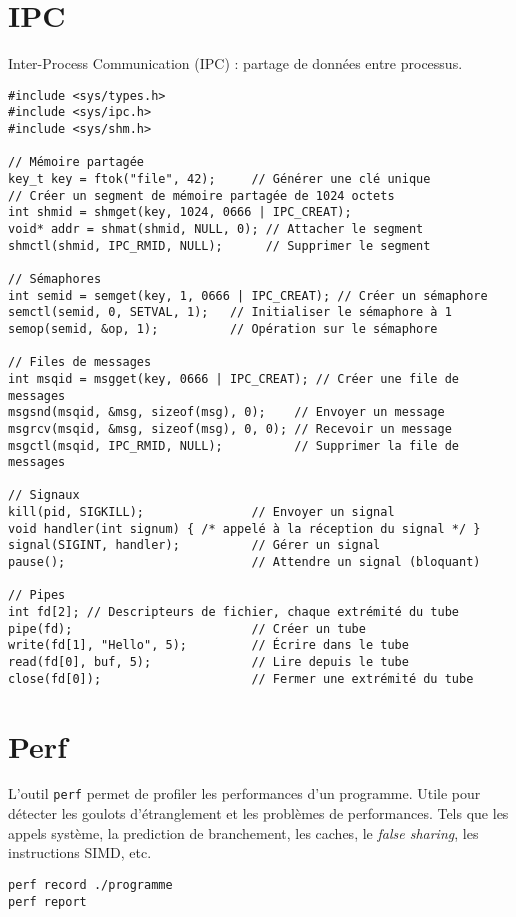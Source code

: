 \documentclass{article}
\newcommand{\cd}{\lstinline}
\begin{document}
\begin{multicols*}{3}
\section*{IPC}
Inter-Process Communication (IPC) : partage de données entre processus.
\begin{lstlisting}
#include <sys/types.h>
#include <sys/ipc.h>
#include <sys/shm.h>

// Mémoire partagée
key_t key = ftok("file", 42);     // Générer une clé unique
// Créer un segment de mémoire partagée de 1024 octets
int shmid = shmget(key, 1024, 0666 | IPC_CREAT);
void* addr = shmat(shmid, NULL, 0); // Attacher le segment
shmctl(shmid, IPC_RMID, NULL);      // Supprimer le segment

// Sémaphores
int semid = semget(key, 1, 0666 | IPC_CREAT); // Créer un sémaphore
semctl(semid, 0, SETVAL, 1);   // Initialiser le sémaphore à 1
semop(semid, &op, 1);          // Opération sur le sémaphore

// Files de messages
int msqid = msgget(key, 0666 | IPC_CREAT); // Créer une file de messages
msgsnd(msqid, &msg, sizeof(msg), 0);    // Envoyer un message
msgrcv(msqid, &msg, sizeof(msg), 0, 0); // Recevoir un message
msgctl(msqid, IPC_RMID, NULL);          // Supprimer la file de messages

// Signaux
kill(pid, SIGKILL);               // Envoyer un signal
void handler(int signum) { /* appelé à la réception du signal */ }
signal(SIGINT, handler);          // Gérer un signal
pause();                          // Attendre un signal (bloquant)

// Pipes
int fd[2]; // Descripteurs de fichier, chaque extrémité du tube
pipe(fd);                         // Créer un tube
write(fd[1], "Hello", 5);         // Écrire dans le tube
read(fd[0], buf, 5);              // Lire depuis le tube
close(fd[0]);                     // Fermer une extrémité du tube
\end{lstlisting}

\section *{Perf}
L'outil \cd{perf} permet de profiler les performances d'un programme.
Utile pour détecter les goulots d'étranglement et les problèmes de performances.
Tels que les appels système, la prediction de branchement, les caches,
le \emph{false sharing}, les instructions SIMD, etc.

\begin{lstlisting}
perf record ./programme
perf report


\end{lstlisting}
\end{multicols*}
\end{document}
